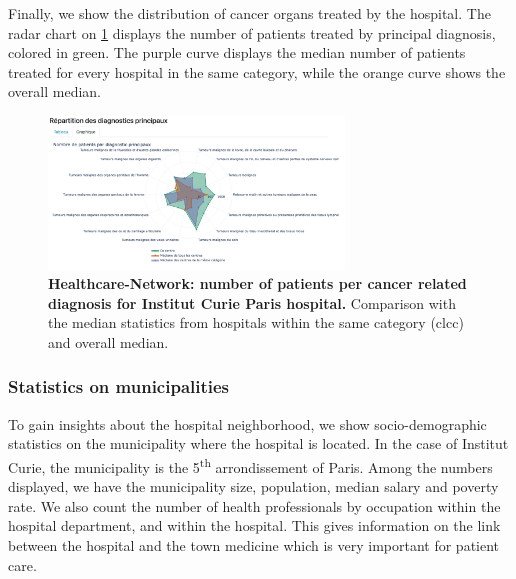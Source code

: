 Finally, we show the distribution of cancer organs treated by the hospital. The radar chart on \cref{fig:hn-curie-dp} displays the number of patients treated by principal diagnosis, colored in green. The purple curve displays the median number of patients treated for every hospital in the same category, while the orange curve shows the overall median.

\begin{figure}[H]
    \includegraphics[width=0.7\textwidth]{images/healthcare-network/curie-dp.png}
    \centering
    \caption{
        \textbf{Healthcare-Network: number of patients per cancer related diagnosis for Institut Curie Paris hospital.} Comparison with the median statistics from hospitals within the same category (\ac{clcc}) and overall median.
    }
    \label{fig:hn-curie-dp}
\end{figure}

\subsubsection{Statistics on municipalities}

To gain insights about the hospital neighborhood, we show socio-demographic statistics on the municipality where the hospital is located. In the case of Institut Curie, the municipality is the 5\textsuperscript{th} arrondissement of Paris. Among the numbers displayed, we have the municipality size, population, median salary and poverty rate. We also count the number of health professionals by occupation within the hospital department, and within the hospital. This gives information on the link between the hospital and the town medicine which is very important for patient care.

